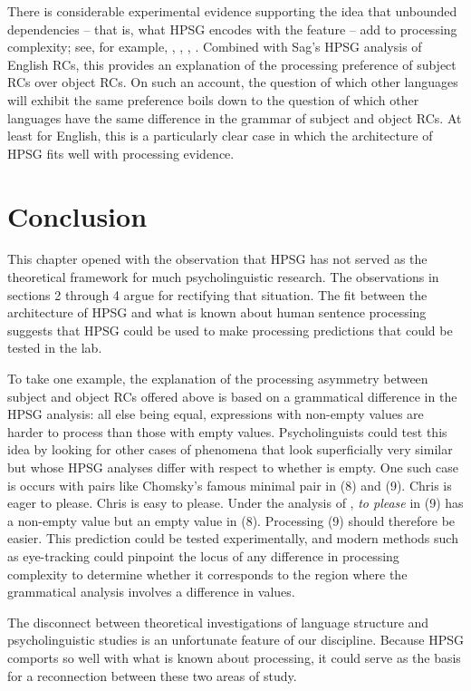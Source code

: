\documentclass[a4paper]{article}
\begin{document}
There is considerable experimental evidence supporting the idea that unbounded dependencies -- that is, what HPSG encodes with the \slasch feature -- add to processing complexity; see, for example, \citet{WannerMaratsos78}, \citet{KingJust91}, \citet{KluenderKutas93}, \citet{Hawkins99a}.  Combined with Sag's HPSG analysis of English RCs, this provides an explanation of the processing preference of subject RCs over object RCs.  On such an account, the question of which other languages will exhibit the same preference boils down to the question of which other languages have the same difference in the grammar of subject and object RCs.  At least for English, this is a particularly clear case in which the architecture of HPSG fits well with processing evidence.

\section{Conclusion}

This chapter opened with the observation that HPSG has not served as the theoretical framework for much psycholinguistic research.  The observations in sections 2 through 4 argue for rectifying that situation.  The fit between the architecture of HPSG and what is known about human sentence processing suggests that HPSG could be used to make processing predictions that could be tested in the lab.  

To take one example, the explanation of the processing asymmetry between subject and object RCs offered above is based on a grammatical difference in the HPSG analysis:  all else being equal, expressions with non-empty \slasch values are harder to process than those with empty \slasch values.  Psycholinguists could test this idea by looking for other cases of phenomena that look superficially very similar but whose HPSG analyses differ with respect to whether \slasch is empty.  One such case is occurs with pairs like Chomsky's famous minimal pair in (8) and (9).
\eal
\ex Chris is eager to please.
\ex Chris is easy to please.
\zl
Under the analysis of \citet{ps2}, {\it to please} in (9) has a non-empty \slasch value but an empty \slasch value in (8).  Processing (9) should therefore be easier.  This prediction could be tested experimentally, and modern methods such as eye-tracking could pinpoint the locus of any difference in processing complexity to determine whether it corresponds to the region where the grammatical analysis involves a difference in \slasch values.

The disconnect between theoretical investigations of language structure and psycholinguistic studies is an unfortunate feature of our discipline.  Because HPSG comports so well with what is known about processing, it could serve as the basis for a reconnection between these two areas of study.

{\sloppy
\printbibliography[heading=subbibliography,notkeyword=this] 
}
\end{document}
